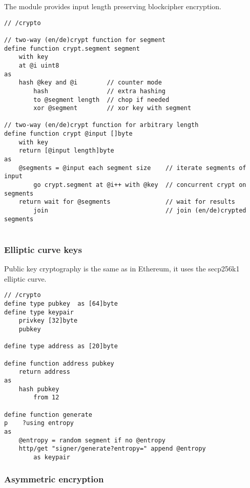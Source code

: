 The module provides input length preserving blockcipher encryption.

\begin{definition}[Blockcipher]\label{def:crypt}
\begin{lstlisting}[language=buzz1]
// /crypto

// two-way (en/de)crypt function for segment
define function crypt.segment segment
    with key
    at @i uint8
as
    hash @key and @i        // counter mode 
        hash                // extra hashing
        to @segment length  // chop if needed
        xor @segment        // xor key with segment

// two-way (en/de)crypt function for arbitrary length 
define function crypt @input []byte
    with key
    return [@input length]byte
as
    @segments = @input each segment size    // iterate segments of input
        go crypt.segment at @i++ with @key  // concurrent crypt on segments
    return wait for @segments               // wait for results
        join                                // join (en/de)crypted segments
        
\end{lstlisting}
\end{definition}    

\subsubsection{Elliptic curve keys}

Public key cryptography is the same as in Ethereum, it uses the secp256k1 elliptic curve.  


\begin{definition}\label{def:ec-keys}
\begin{lstlisting}[language=buzz1]
// /crypto
define type pubkey  as [64]byte
define type keypair
    privkey [32]byte
    pubkey
    
define type address as [20]byte

define function address pubkey
    return address
as 
    hash pubkey 
        from 12

define function generate 
p    ?using entropy
as
    @entropy = random segment if no @entropy
    http/get "signer/generate?entropy=" append @entropy 
        as keypair

\end{lstlisting}
\end{definition}    

\subsubsection{Asymmetric encryption}

